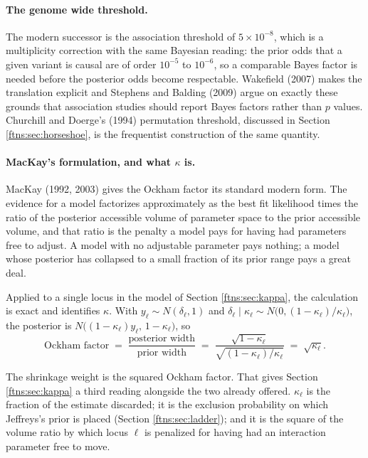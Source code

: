 \paragraph{The genome wide threshold.} The modern successor is the association threshold of
$5\times10^{-8}$, which is a multiplicity correction with the same Bayesian reading: the prior odds
that a given variant is causal are of order $10^{-5}$ to $10^{-6}$, so a comparable Bayes factor is
needed before the posterior odds become respectable. Wakefield (2007) makes the translation
explicit and Stephens and Balding (2009) argue on exactly these grounds that association studies
should report Bayes factors rather than $p$ values. Churchill and Doerge's (1994) permutation
threshold, discussed in Section \ref{ftns:sec:horseshoe}, is the frequentist construction of the same
quantity.

\paragraph{MacKay's formulation, and what $\kappa$ is.} MacKay (1992, 2003) gives the Ockham factor
its standard modern form. The evidence for a model factorizes approximately as the best fit
likelihood times the ratio of the posterior accessible volume of parameter space to the prior
accessible volume, and that ratio is the penalty a model pays for having had parameters free to
adjust. A model with no adjustable parameter pays nothing; a model whose posterior has collapsed to
a small fraction of its prior range pays a great deal.

Applied to a single locus in the model of Section \ref{ftns:sec:kappa}, the calculation is exact and
identifies $\kappa$. With $y_\ell\sim N(\delta_\ell,1)$ and $\delta_\ell\mid\kappa_\ell\sim
N\big(0,(1-\kappa_\ell)/\kappa_\ell\big)$, the posterior is
$N\big((1-\kappa_\ell)y_\ell,\,1-\kappa_\ell\big)$, so
\begin{equation}
\text{Ockham factor}
\;=\;\frac{\text{posterior width}}{\text{prior width}}
\;=\;\frac{\sqrt{1-\kappa_\ell}}{\sqrt{(1-\kappa_\ell)/\kappa_\ell}}
\;=\;\sqrt{\kappa_\ell} .
\label{ftns:eq:ockhamkappa}
\end{equation}

The shrinkage weight is the squared Ockham factor. That gives Section \ref{ftns:sec:kappa} a third
reading alongside the two already offered. $\kappa_\ell$ is the fraction of the estimate discarded;
it is the exclusion probability on which Jeffreys's prior is placed (Section \ref{ftns:sec:ladder}); and
it is the square of the volume ratio by which locus $\ell$ is penalized for having had an
interaction parameter free to move.

